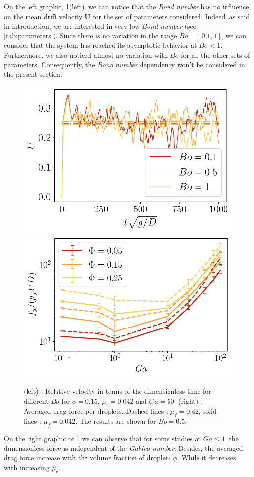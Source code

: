 On the left graphic, \ref{fig:avgF}(left), we can notice that the \textit{Bond number} has no influence on the mean drift velocity $\bm{U}$ for the set of parameters considered.
Indeed, as said in introduction, we are interested in very low \textit{Bond number} (see \ref{tab:parameters}).
Since there is no variation in the range $Bo = [0.1,1]$, we can consider that the system has reached its asymptotic behavior at $Bo<1$.
Furthermore, we also noticed almost no variation with $Bo$ for all the other sets of parameters.
Consequently, the \textit{Bond number} dependency won't be considered in the present section. 
\begin{figure}[h!]
    \centering
    \includegraphics[height=0.22\textheight]{image/N_10/Favg/Bosdep_Ga_50.pdf}
    \includegraphics[height=0.22\textheight]{image/N_10/Favg/F_mu_Bo_0_5.pdf}
    \caption{(left) : Relative velocity in terms of the dimensionless time for different $Bo$ for $\phi = 0.15$, $\mu_r = 0.042$ and $Ga = 50$. (right) : Averaged drag force per droplets. Dashed lines : $\mu_f = 0.42$, solid lines : $\mu_f = 0.042$. The results are shown for $Bo = 0.5$.} 
    \label{fig:avgF}
\end{figure}
On the right graphic of \ref{fig:avgF} we can observe that for some studies at $Ga\le 1$, the dimensionless force is independent of the  \textit{Galileo number}. 
Besides, the averaged drag force increase with the volume fraction of droplets $\phi$.
While it decreases with increasing $\mu_r$. 

